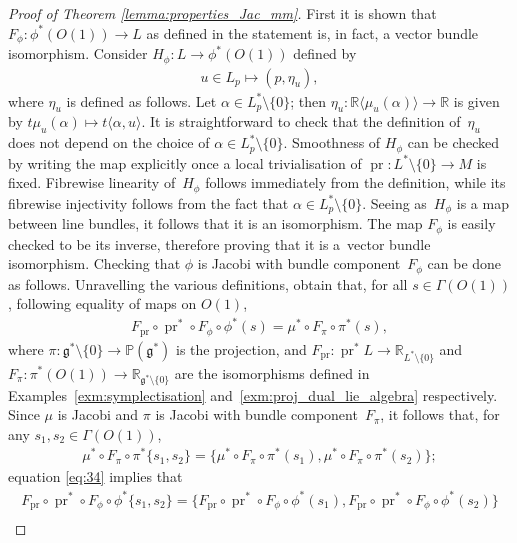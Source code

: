 \documentclass[pdftex]{sigma}
\numberwithin{equation}{section}
\newcommand{\pg}{\mathbb{P}(\mathfrak{g}^*)} %
\newcommand{\RR}{\mathbb{R}}
\begin{document}
\begin{proof}[Proof of Theorem \ref{lemma:properties_Jac_mm}] First it is shown that $F_{\phi} \colon \phi^*(O(1)) \to L$ as def\/ined in the statement is, in fact, a vector bundle isomorphism. Consider $H_{\phi} \colon L \to \phi^*(O(1))$ def\/ined by
 \begin{gather*}
 u \in L_p \mapsto (p,\eta_u),
 \end{gather*}
where $\eta_u$ is def\/ined as follows. Let $\alpha \in L^*_p \setminus \{0\}$; then $\eta_u \colon \RR \langle \mu_u(\alpha)\rangle \to \RR$ is given by $t\mu_u(\alpha) \mapsto t \langle \alpha , u \rangle$. It is straightforward to check that the def\/inition of~$\eta_u$ does not depend on the choice of $\alpha \in L^*_p \setminus \{0\}$. Smoothness of $H_{\phi}$ can be checked by writing the map explicitly once a local trivialisation of $\operatorname{pr} \colon L^*\setminus \{0\} \to M$ is f\/ixed. Fibrewise linearity of~$H_{\phi}$ follows immediately from the def\/inition, while its f\/ibrewise injectivity follows from the fact that $\alpha \in L^*_p \setminus \{0\}$. Seeing as~$H_{\phi}$ is a map between line bundles, it follows that it is an isomorphism. The map $F_{\phi}$ is easily checked to be its inverse, therefore proving that it is a~vector bundle isomorphism. Checking that $\phi$ is Jacobi with bundle component~$F_{\phi}$ can be done as follows. Unravelling the various def\/initions, obtain that, for all $s \in \Gamma(O(1))$, following equality of maps on $O(1)$,
 \begin{gather} \label{eq:34}
 F_{\operatorname{pr}} \circ \operatorname{pr}^* \circ F_{\phi} \circ \phi^*(s) = \mu^* \circ F_{\pi} \circ \pi^*(s),
 \end{gather}
where $\pi \colon \mathfrak{g}^* \setminus \{0\} \to \pg$ is the projection, and $F_{\operatorname{pr}} \colon \operatorname{pr}^*L \to \RR_{L^* \setminus \{0\}}$ and $F_{\pi} \colon \pi^*(O(1)) \to \RR_{\mathfrak{g}^* \setminus \{0\}}$ are the isomorphisms def\/ined in Examples~\ref{exm:symplectisation} and~\ref{exm:proj_dual_lie_algebra} respectively. Since $\mu$ is Jacobi and $\pi$ is Jacobi with bundle component~$F_{\pi}$, it follows that, for any $s_1,s_2 \in \Gamma(O(1))$,
 \begin{gather*}
 \mu^* \circ F_{\pi} \circ \pi^* \{s_1,s_2\} = \{\mu^* \circ F_{\pi} \circ \pi^*(s_1), \mu^* \circ F_{\pi} \circ \pi^*(s_2)\};
 \end{gather*}
equation \eqref{eq:34} implies that
 \begin{gather}
 F_{\operatorname{pr}} \circ \operatorname{pr}^* \circ F_{\phi} \circ \phi^*\{s_1,s_2\} = \{ F_{\operatorname{pr}} \circ \operatorname{pr}^* \circ F_{\phi} \circ \phi^*(s_1), F_{\operatorname{pr}} \circ \operatorname{pr}^* \circ F_{\phi} \circ \phi^*(s_2)\} \nonumber\\

\end{gather}
\end{proof}
\end{document}
